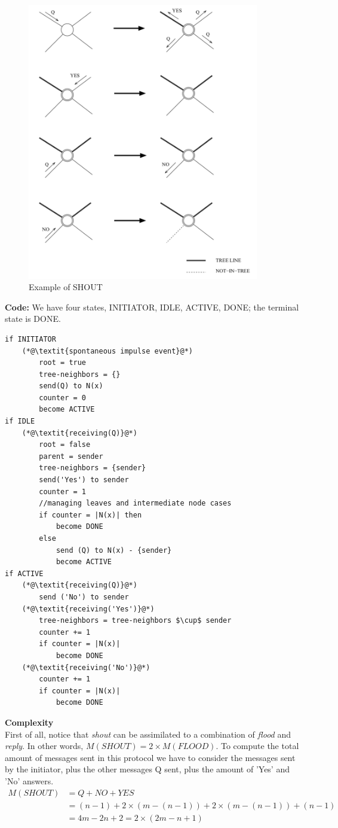 \documentclass[paper=a4, fontsize=11pt]{scrartcl} %
\numberwithin{equation}{section} %
\numberwithin{figure}{section} %
\numberwithin{table}{section} %
\begin{document}
\begin{figure}[H]
  \centering
  \includegraphics[width=0.9\textwidth]{img/shout.png}
  \caption{Example of SHOUT}
  \label{fig:boat1}
\end{figure}
\newpage
\textbf{Code:} We have four states, INITIATOR, IDLE, ACTIVE, DONE; the terminal state is DONE.
\begin{lstlisting}
if INITIATOR
	(*@\textit{spontaneous impulse event}@*)
		root = true
		tree-neighbors = {}
		send(Q) to N(x)
		counter = 0
		become ACTIVE
if IDLE
	(*@\textit{receiving(Q)}@*)
		root = false
		parent = sender
		tree-neighbors = {sender}
		send('Yes') to sender
		counter = 1
		//managing leaves and intermediate node cases
		if counter = |N(x)| then
			become DONE
		else
			send (Q) to N(x) - {sender}
			become ACTIVE			 
if ACTIVE
	(*@\textit{receiving(Q)}@*)
		send ('No') to sender
	(*@\textit{receiving('Yes')}@*)
		tree-neighbors = tree-neighbors $\cup$ sender
		counter += 1
		if counter = |N(x)|
			become DONE
	(*@\textit{receiving('No')}@*)
		counter += 1
		if counter = |N(x)|
			become DONE			
\end{lstlisting}
\textbf{Complexity} \\
First of all, notice that \textit{shout} can be assimilated to a combination of \textit{flood} and \textit{reply}. In other words, $M(SHOUT) = 2	\times M(FLOOD)$.
To compute the total amount of messages sent in this protocol we have to consider the messages sent by the initiator, plus the other messages Q sent, plus the amount of 'Yes' and 'No' answers.
\begin{align*}
	M(SHOUT) &= Q + NO  + YES \\ 
	&= (n-1)+ 2\times(m-(n-1)) + 2\times(m-(n-1)) + (n-1) \\
	&= 4m - 2n + 2 = 2\times(2m-n+1)
\end{align*}
\end{document}
